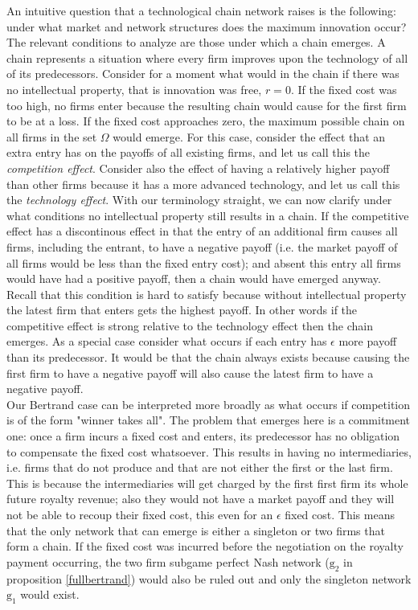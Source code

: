 \documentclass{article}
\begin{document}
\indent An intuitive question that a technological chain network raises is the following: under what market and network structures does the maximum innovation occur? The relevant conditions to analyze are those under which a chain emerges. A chain represents a situation where every firm improves upon the technology of all of its predecessors. Consider for a moment what would in the chain if there was no intellectual property, that is innovation was free, $r=0$. If the fixed cost was too high, no firms enter because the resulting chain would cause for the first firm to be at a loss. If the fixed cost approaches zero, the maximum possible chain on all firms in the set $\Omega$ would emerge. For this case, consider the effect that an extra entry has on the payoffs of all existing firms, and let us call this the \textit{competition effect}. Consider also the effect of having a relatively higher payoff than other firms because it has a more advanced technology, and let us call this the \textit{technology effect}. With our terminology straight, we can now clarify under what conditions no intellectual property still results in a chain. If the competitive effect has a discontinous effect in that the entry of an additional firm causes all firms, including the entrant, to have a negative payoff (i.e. the market payoff of all firms would be less than the fixed entry cost); and absent this entry all firms would have had a positive payoff, then a chain would have emerged anyway. Recall that this condition is hard to satisfy because without intellectual property the latest firm that enters gets the highest payoff. In other words if the competitive effect is strong relative to the technology effect then the chain emerges. As a special case consider what occurs if each entry has $\epsilon$ more payoff than its predecessor. It would be that the chain always exists because causing the first firm to have a negative payoff will also cause the latest firm to have a negative payoff. \\
\indent Our Bertrand case can be interpreted more broadly as what occurs if competition is of the form "winner takes all". The problem that emerges here is a commitment one: once a firm incurs a fixed cost and enters, its predecessor has no obligation to compensate the fixed cost whatsoever. This results in having no intermediaries, i.e. firms that do not produce and that are not either the first or the last firm. This is because the intermediaries will get charged by the first first firm its whole future royalty revenue; also they would not have a market payoff and they will not be able to recoup their fixed cost, this even for an $\epsilon$ fixed cost. This means that the only network that can emerge is either a singleton or two firms that form a chain. If the fixed cost was incurred before the negotiation on the royalty payment occurring, the two firm subgame perfect Nash network ($\text{g}_2$ in proposition \ref{fullbertrand}) would also be ruled out and only the singleton network $\text{g}_1$ would exist. 
\end{document}
